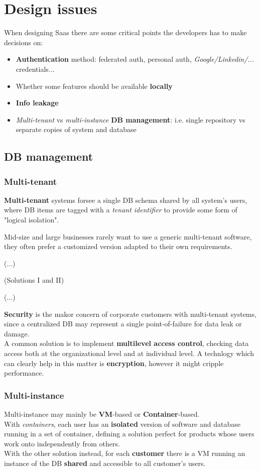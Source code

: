 \section{Design issues}
When designing Saas there are some critical points the developers has to make decisions on:
\begin{itemize}
   \item \textbf{Authentication} method: federated auth, personal auth, \textit{Google/Linkedin/...} credentials... 
   \item Whether some features should be available \textbf{locally}
   \item \textbf{Info leakage}
   \item \textit{Multi-tenant} vs \textit{multi-instance} \textbf{DB management}:
   i.e. single repository vs separate copies of system and database
\end{itemize}

\subsection{DB management}
\subsubsection{Multi-tenant}
\textbf{Multi-tenant} systems forsee a single DB schema shared by all system's users,
where DB items are tagged with a \textit{tenant identifier} to provide some form of "logical isolation".

Mid-size and large businesses rarely want to use a generic multi-tenant software, 
they often prefer a customized version adapted to their own requirements.

(...)

(Solutions I and II)

(...)

\textbf{Security} is the makor concern of corporate customers with multi-tenant systems,
since a centralized DB may represent a single point-of-failure for data leak or damage.\\
A common solution is to implement \textbf{multilevel access control}, checking data access both at the organizational level and at individual level.
A technlogy which can clearly help in this matter is \textbf{encryption},
however it might cripple performance.

\subsubsection{Multi-instance}
Multi-instance may mainly be \textbf{VM}-based or \textbf{Container}-based.\\
With \textit{containers}, each user has an \textbf{isolated} version of software and database running in a set of container,
defining a solution perfect for products whose users work onto independently from others.\\
With the other solution instead, for each \textbf{customer} there is a VM running an instance of the DB \textbf{shared} and accessible to all customer's users.\nl

